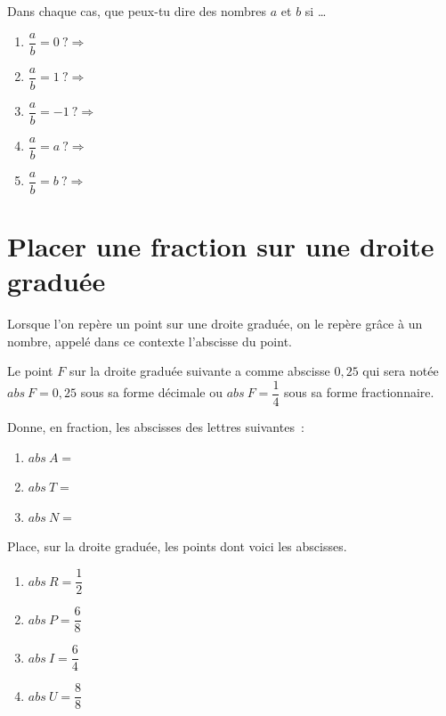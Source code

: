 \documentclass[../math2.tex]{subfiles}
\begin{document}
\begin{exercise}
  Dans chaque cas, que peux-tu dire des nombres $a$ et $b$ si \dots
  \begin{enumerate}[itemsep=2em]
    \item $\dfrac{a}{b}=0 ~? \Rightarrow$ \dotfill
    \item $\dfrac{a}{b}=1 ~?\Rightarrow$ \dotfill
    \item $\dfrac{a}{b}=-1 ~?\Rightarrow$ \dotfill
    \item $\dfrac{a}{b}=a ~?\Rightarrow$ \dotfill
    \item $\dfrac{a}{b}=b ~?\Rightarrow$ \dotfill
  \end{enumerate}
\end{exercise}

\section{Placer une fraction sur une droite graduée}

Lorsque l'on repère un point sur une droite graduée, on le repère grâce à un nombre, appelé dans ce contexte l'abscisse du point.

\exemple Le point $F$ sur la droite graduée suivante a comme abscisse $0,25$ qui sera notée $abs~F = 0,25$ sous sa forme décimale ou $abs~F=\dfrac{1}{4}$ sous sa forme fractionnaire.
\begin{center}
  
\end{center}

\begin{exercise}
  Donne, en fraction, les abscisses des lettres suivantes~:
  \begin{enumerate}[cols=3]
    \item $abs~A=$
    \item $abs~T=$
    \item $abs~N=$
  \end{enumerate}
\end{exercise}

\begin{exercise}
  Place, sur la droite graduée, les points dont voici les abscisses.
  \begin{enumerate}[cols=4]
    \item $abs~R = \dfrac{1}{2}$
    \item $abs~P = \dfrac{6}{8}$
    \item $abs~I = \dfrac{6}{4}$
    \item $abs~U = \dfrac{8}{8}$
  \end{enumerate}
  \begin{center}
    
  \end{center}
\end{exercise}
\end{document}
